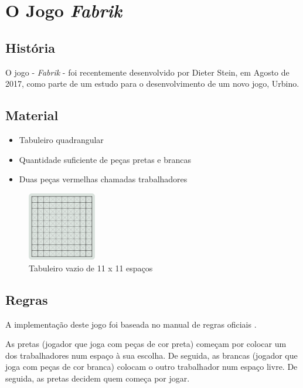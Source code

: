 \documentclass[a4paper]{article}
\begin{document}
\newpage

\section{O Jogo \textit{Fabrik}}

\subsection{História}
O jogo - \textit{Fabrik} - foi recentemente desenvolvido por Dieter Stein, em Agosto de 2017, como parte de um estudo para o desenvolvimento de um novo jogo, Urbino.

\subsection{Material}
\begin{itemize}
	\item Tabuleiro quadrangular
	\item Quantidade suficiente de peças pretas e brancas
	\item Duas peças vermelhas chamadas trabalhadores
\end{itemize}

\begin{figure}[h!]
\begin{center}
\includegraphics[height=3cm,width=3cm]{images/fabrik_empty_board.png}
\caption{Tabuleiro vazio de 11 x 11 espaços}
\label{Figura 1}
\end{center}
\end{figure}

\subsection{Regras}
A implementação deste jogo foi baseada no manual de regras oficiais \cite{games_and_puzzles_by_dieter_stein}.

As pretas (jogador que joga com peças de cor preta) começam por colocar um dos trabalhadores num espaço à sua escolha. De seguida, as brancas (jogador que joga com peças de cor branca) colocam o outro trabalhador num espaço livre. De seguida, as pretas decidem quem começa por jogar.
\end{document}
